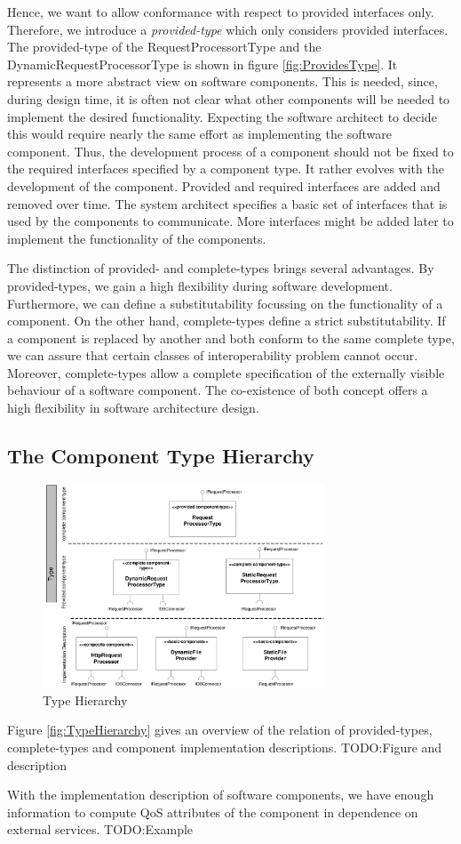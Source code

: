 Hence, we want to allow conformance with respect to provided interfaces only.
Therefore, we introduce a \emph{provided-type} which only considers provided
interfaces. The provided-type of the RequestProcessortType and the
DynamicRequestProcessorType is shown in figure \ref{fig:ProvidesType}. 
It represents a more abstract view on software components. This is needed,
since, during design time, it is often not clear what other components will be
needed to implement the desired functionality. Expecting the software architect
to decide this would require nearly the same effort as implementing the software
component. Thus, the development process of a component should not be fixed to
the required interfaces specified by a component type. It rather evolves with
the development of the component. Provided and required interfaces are added and
removed over time. The system architect specifies a basic set of interfaces that
is used by the components to communicate. More interfaces might be added later
to implement the functionality of the components.


The distinction of provided- and complete-types brings several advantages. By
provided-types, we gain a high flexibility during software development.
Furthermore, we can define a substitutability focussing on the functionality of
a component. On the other hand, complete-types define a strict substitutability.
If a component is replaced by another and both conform to the same complete
type, we can assure that certain classes of interoperability problem cannot
occur. Moreover, complete-types allow a complete specification of the externally
visible behaviour of a software component. The co-existence of both concept
offers a high flexibility in software architecture design.

\subsection{The Component Type Hierarchy}

\begin{figure}[htbp]
\centering
\includegraphics[width=3.3in]{example/TypeHierachy}
\caption{Type Hierarchy}
\label{fig:WebserverComponents}
\end{figure}

Figure \ref{fig:TypeHierarchy} gives an overview of the relation of
provided-types, complete-types and component implementation descriptions.
TODO:Figure and description

With the implementation description of software components, we have enough
information to compute QoS attributes of the component in dependence on external
services.
TODO:Example

